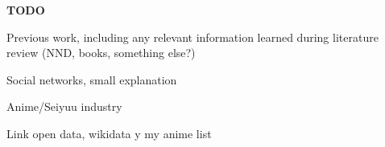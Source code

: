 
\textbf{TODO}


Previous work, including any relevant information learned during literature review (NND, books, something else?)

Social networks, small explanation

Anime/Seiyuu industry

Link open data, wikidata y my anime list
